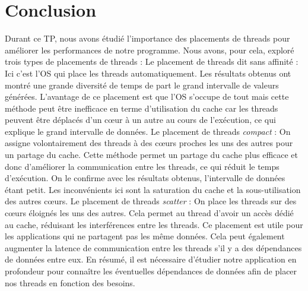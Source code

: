 \documentclass{rapport}
\begin{document}
    \part{Conclusion}
    Durant ce TP, nous avons étudié l'importance des placements de threads pour améliorer les performances de notre programme. Nous avons, pour cela, exploré trois types de placements de threads : 
    \newline \indent
        Le placement de threads dit sans affinité : Ici c'est l'OS qui place les threads automatiquement. Les résultats obtenus ont montré une grande diversité de temps de part le grand intervalle de valeurs générées. L'avantage de ce placement est que l'OS s'occupe de tout mais cette méthode peut être inefficace en terme d'utilisation du cache car les threads peuvent être déplacés d'un cœur à un autre au cours de l'exécution, ce qui explique le grand intervalle de données.
        \newline\newline\indent
        Le placement de threads \textit{compact} : On assigne volontairement des threads à des cœurs proches les uns des autres pour un partage du cache. Cette méthode permet un partage du cache plus efficace et donc d'améliorer la communication entre les threads, ce qui réduit le temps d'exécution. On le confirme avec les résultats obtenus, l'intervalle de données étant petit. Les inconvénients ici sont la saturation du cache et la sous-utilisation des autres cœurs.
        \newline\newline \indent
        Le placement de threads \textit{scatter} : On place les threads sur des cœurs éloignés les uns des autres. Cela permet au thread d'avoir un accès dédié au cache, réduisant les interférences entre les threads. Ce placement est utile pour les applications qui ne partagent pas les même données. Cela peut également augmenter la latence de communication entre les threads s'il y a des dépendances de données entre eux.
        \newline\newline
        \indent
        En résumé, il est nécessaire d'étudier notre application en profondeur pour connaître les éventuelles dépendances de données afin de placer nos threads en fonction des besoins.
\end{document}

